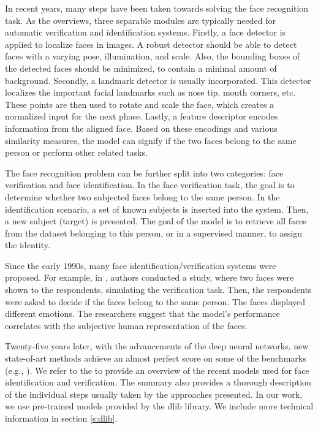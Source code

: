 In recent years, many steps have been taken towards solving the face recognition task. As the \cite{ranjan2018deep} overviews, three separable modules are typically needed for automatic verification and identification systems. Firstly, a face detector is applied to localize faces in images. A robust detector should be able to detect faces with a varying pose, illumination, and scale. Also, the bounding boxes of the detected faces should be minimized, to contain a minimal amount of background. Secondly, a landmark detector is usually incorporated. This detector localizes the important facial landmarks such as nose tip, mouth corners, etc. These points are then used to rotate and scale the face, which creates a normalized input for the next phase. Lastly, a feature descriptor encodes information from the aligned face. Based on these encodings and various similarity measures, the model can signify if the two faces belong to the same person or perform other related tasks.

The face recognition problem can be further split into two categories: face verification and face identification. In the face verification task, the goal is to determine whether two subjected faces belong to the same person. In the identification scenario,
a set of known subjects is inserted into the system. Then, a new subject (target) is presented. The goal of the model is to retrieve all faces from the dataset belonging to this person, or in a supervised manner, to assign the identity.

Since the early 1990s, many face identification/verification systems were proposed. For example, in \citep{kalocsai1998face}, authors conducted a study, where two faces were shown to the respondents, simulating the verification task. Then, the respondents were asked to decide if the faces belong to the same person. The faces displayed different emotions. The researchers suggest that the model's performance correlates with the subjective human representation of the faces.

Twenty-five years later, with the advancements of the deep neural networks, new state-of-art methods achieve an almost perfect score on some of the benchmarks (e.g., \citep{huang2008labeled}). We refer to the \citep{masi2018deep} to provide an overview of the recent models used for face identification and verification. The summary also provides a thorough description of the individual steps usually taken by the approaches presented. In our work, we use pre-trained models provided by the dlib library. We include more technical information in section \ref{s:dlib}.

